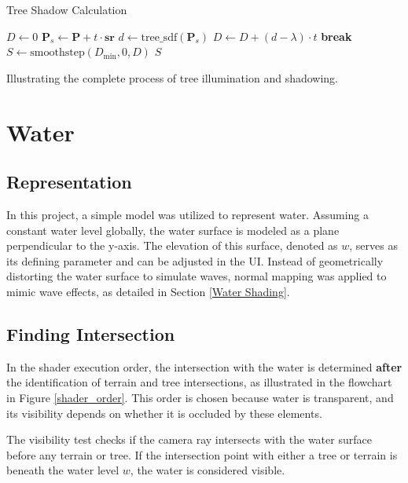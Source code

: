 \begin{algorithm}
\caption{Tree Shadow Calculation}
\label{algo: tree shadow}
\begin{algorithmic}
    \State $D \gets 0$
        \State $\mathbf{P}_s \gets \mathbf{P} + t \cdot \mathbf{sr}$
        \State $d \gets \text{tree\_sdf}(\mathbf{P}_s)$
            \State $D \gets D + (d - \lambda) \cdot t$
        \EndIf
            \State \textbf{break}
        \EndIf
    \EndFor
    \State $S \gets \text{smoothstep}(D_{\text{min}}, 0, D)$
    \State \Return $S$
\EndFunction
\end{algorithmic}
\end{algorithm}

{Illustrating the complete process of tree illumination and shadowing.}

\section{Water}

\subsection{Representation}

In this project, a simple model was utilized to represent water. Assuming a constant water level globally, the water surface is modeled as a plane perpendicular to the y-axis. The elevation of this surface, denoted as $w$, serves as its defining parameter and can be adjusted in the UI. Instead of geometrically distorting the water surface to simulate waves, normal mapping was applied to mimic wave effects, as detailed in Section \ref{Water Shading}.

\subsection{Finding Intersection}

In the shader execution order, the intersection with the water is determined \textbf{after} the identification of terrain and tree intersections, as illustrated in the flowchart in Figure \ref{shader_order}. This order is chosen because water is transparent, and its visibility depends on whether it is occluded by these elements.

The visibility test checks if the camera ray intersects with the water surface before any terrain or tree. If the intersection point with either a tree or terrain is beneath the water level $w$, the water is considered visible.

